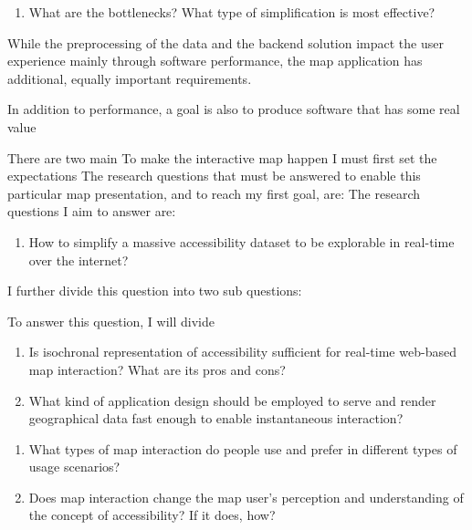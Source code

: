 \begin{enumerate}
	\item What are the bottlenecks? What type of simplification is most effective? 
\end{enumerate}

While the preprocessing of the data and the backend solution
impact the user experience mainly through software performance,
the map application has additional, equally important requirements.

In addition to performance,
a goal is also to produce software that has some real value

  There are two main  To make the interactive map happen I must first set the expectations
The research questions that must be answered to
enable this particular map presentation,
and to reach my first goal, are:
The research questions I aim to answer are:
\begin{enumerate}
	\item How to simplify a massive accessibility dataset to be explorable in real-time over the internet?
\end{enumerate}

I further divide this question into two sub questions:


To answer this question, I will divide
\begin{enumerate}
	\item Is isochronal representation of accessibility sufficient for real-time web-based map interaction? What are its pros and cons?
	\item What kind of application design should be employed to serve and render geographical data fast enough to enable instantaneous interaction?
\end{enumerate}

\begin{enumerate}
	\item What types of map interaction do people use and prefer in different types of usage scenarios?
	\item Does map interaction change the map user's perception and understanding of the concept of accessibility? If it does, how?
\end{enumerate}


